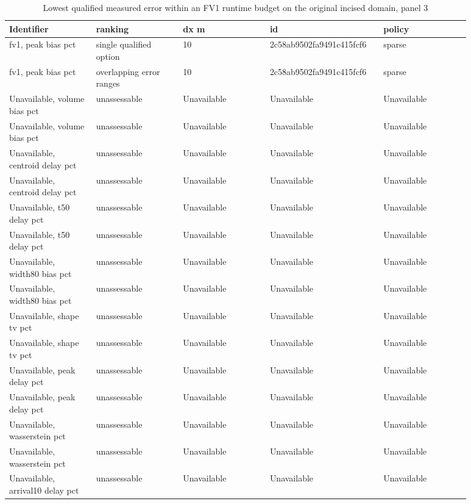 \begin{longtable}{p{0.1760\linewidth}p{0.1760\linewidth}p{0.1760\linewidth}p{0.1760\linewidth}p{0.1760\linewidth}}
\caption{Lowest qualified measured error within an FV1 runtime budget on the original incised domain, panel 3}\\
\hline
Identifier & ranking & dx m & id & policy \\
\hline\endhead
fv1, peak bias pct & single qualified option & 10 & 2c58ab9502fa9491c415fcf6 & sparse \\
fv1, peak bias pct & overlapping error ranges & 10 & 2c58ab9502fa9491c415fcf6 & sparse \\
Unavailable, volume bias pct & unassessable & Unavailable & Unavailable & Unavailable \\
Unavailable, volume bias pct & unassessable & Unavailable & Unavailable & Unavailable \\
Unavailable, centroid delay pct & unassessable & Unavailable & Unavailable & Unavailable \\
Unavailable, centroid delay pct & unassessable & Unavailable & Unavailable & Unavailable \\
Unavailable, t50 delay pct & unassessable & Unavailable & Unavailable & Unavailable \\
Unavailable, t50 delay pct & unassessable & Unavailable & Unavailable & Unavailable \\
Unavailable, width80 bias pct & unassessable & Unavailable & Unavailable & Unavailable \\
Unavailable, width80 bias pct & unassessable & Unavailable & Unavailable & Unavailable \\
Unavailable, shape tv pct & unassessable & Unavailable & Unavailable & Unavailable \\
Unavailable, shape tv pct & unassessable & Unavailable & Unavailable & Unavailable \\
Unavailable, peak delay pct & unassessable & Unavailable & Unavailable & Unavailable \\
Unavailable, peak delay pct & unassessable & Unavailable & Unavailable & Unavailable \\
Unavailable, wasserstein pct & unassessable & Unavailable & Unavailable & Unavailable \\
Unavailable, wasserstein pct & unassessable & Unavailable & Unavailable & Unavailable \\
Unavailable, arrival10 delay pct & unassessable & Unavailable & Unavailable & Unavailable \\

\end{longtable}
